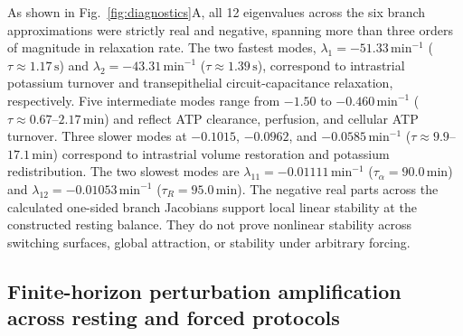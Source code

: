 \documentclass[final,5p,times]{elsarticle}
\begin{document}
As shown in Fig.~\ref{fig:diagnostics}A, all 12 eigenvalues across the six branch approximations were strictly real and negative, spanning more than three orders of magnitude in relaxation rate. The two fastest modes, \(\lambda_1=-51.33\,\mathrm{min}^{-1}\) (\(\tau\approx1.17\,\mathrm{s}\)) and \(\lambda_2=-43.31\,\mathrm{min}^{-1}\) (\(\tau\approx1.39\,\mathrm{s}\)), correspond to intrastrial potassium turnover and transepithelial circuit-capacitance relaxation, respectively. Five intermediate modes range from \(-1.50\) to \(-0.460\,\mathrm{min}^{-1}\) (\(\tau\approx0.67\)--\(2.17\,\mathrm{min}\)) and reflect ATP clearance, perfusion, and cellular ATP turnover. Three slower modes at \(-0.1015\), \(-0.0962\), and \(-0.0585\,\mathrm{min}^{-1}\) (\(\tau\approx9.9\)--\(17.1\,\mathrm{min}\)) correspond to intrastrial volume restoration and potassium redistribution. The two slowest modes are \(\lambda_{11}=-0.01111\,\mathrm{min}^{-1}\) (\(\tau_\alpha=90.0\,\mathrm{min}\)) and \(\lambda_{12}=-0.01053\,\mathrm{min}^{-1}\) (\(\tau_R=95.0\,\mathrm{min}\)).
The negative real parts across the calculated one-sided branch Jacobians support local linear stability at the constructed resting balance. They do not prove nonlinear stability across switching surfaces, global attraction, or stability under arbitrary forcing.

\subsection{Finite-horizon perturbation amplification across resting and forced protocols}\label{sec:stability-perturbations}
\end{document}
